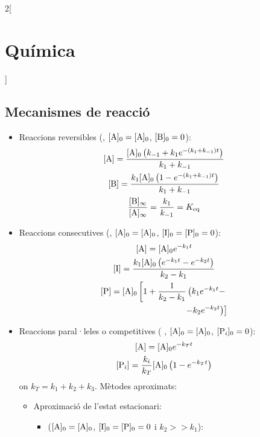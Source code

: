 \documentclass[class=article,10pt,crop=false]{standalone}
\begin{document}
\begin{multicols}{2}[\section{Química}]
\subsection{Mecanismes de reacció}
\begin{itemize}
    \item Reaccions reversibles (, $\ce{[A]_0}=\ce{[A]_0}$, $\ce{[B]_0}=0$):
    \begin{gather*}
        \ce{[A]}=\frac{\ce{[A]_0}\left(k_{-1}+k_1e^{-(k_1+k_{-1})t}\right)}{k_1+k_{-1}}\\
        \ce{[B]}=\frac{k_1\ce{[A]_0}\left(1-e^{-(k_1+k_{-1})t}\right)}{k_1+k_{-1}}\\
        \frac{\ce{[B]_\infty}}{\ce{[A]_\infty}}=\frac{k_1}{k_{-1}}=K_\text{eq}
    \end{gather*}
    \item Reaccions consecutives (, $\ce{[A]_0}=\ce{[A]_0}$, $\ce{[I]_0}=\ce{[P]_0}=0$):
    \begin{gather*}
        \ce{[A]}=\ce{[A]_0}e^{-k_1t}\\
        \ce{[I]}=\frac{k_1\ce{[A]_0}\left(e^{-k_1t}-e^{-k_2t}\right)}{k_2-k_1}\\
        \begin{split}
        \ce{[P]}=\ce{[A]_0}\left[1+\frac{1}{k_2-k_1}\left(k_1e^{-k_1t}-\right.\right.\\\left.\left.-k_2e^{-k_2t}\right)\right]
        \end{split}
    \end{gather*}
    \item Reaccions paral·leles o competitives (  , $\ce{[A]_0}=\ce{[A]_0}$, $\ce{[P_i]_0}=0$):
    \begin{gather*}
        \ce{[A]}=\ce{[A]_0}e^{-k_Tt}\\
        \ce{[P_i]}=\frac{k_i}{k_T}\ce{[A]_0}\left(1-e^{-k_Tt}\right)
    \end{gather*}
    {\footnotesize on $k_T=k_1+k_2+k_3$.}\newline
    Mètodes aproximats:
    \begin{itemize}
        \item Aproximació de l'estat es\-ta\-ci\-o\-na\-ri:
        \begin{itemize}
            \item {} ($\ce{[A]_0}=\ce{[A]_0}$, $\ce{[I]_0}=\ce{[P]_0}=0$ i $k_2>>k_1$):
            \begin{gather*}

\end{gather*}
\end{itemize}
\end{itemize}
\end{itemize}
\end{multicols}
\end{document}
